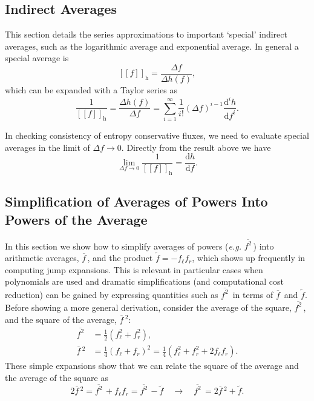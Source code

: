 \documentclass[10pt]{article}
\renewcommand{\j}[1]{\Delta #1}
\renewcommand{\d}{\mathrm{d}}
\newcommand{\avg}[1]{\overline{#1}\,}
\newcommand{\invavg}[1]{\widetilde{#1}}
\newcommand{\spavg}[2]{\left[\left[#1\right]\right]_{\mathrm{#2}}}
\begin{document}
\subsection{Indirect Averages}
This section details the series approximations to important `special' indirect averages, such as the logarithmic average and exponential average.
In general a special average is
\begin{equation}
	\spavg{f}{h} = \frac{\j{f}}{\j{h(f)}},
\end{equation}
which can be expanded with a Taylor series as
\begin{equation}
	\frac{1}{\spavg{f}{h}} = \frac{\j{h(f)}}{\j{f}} = \sum_{i=1}^{\infty}\frac{1}{i!}(\j{f})^{i-1}\frac{\d^{i}h}{\d f^{i}}.
\end{equation}

In checking consistency of entropy conservative fluxes, we need to evaluate special averages in the limit of $\j{f}\to0$.
Directly from the result above we have 
\begin{equation}
	\lim_{\j{f}\to0}\frac{1}{\spavg{f}{h}} = \frac{\d h}{\d f}.
\end{equation}


\subsection{Simplification of Averages of Powers Into Powers of the Average} \label{sec: avg powers}
In this section we show how to simplify averages of powers (\emph{e.g.} $\avg{f^2}$) into arithmetic averages, $\avg{f}$, and the product $\invavg{f} = -f_\ell f_r$, which shows up frequently in computing jump expansions.
This is relevant in particular cases when polynomials are used and dramatic simplifications (and computational cost reduction) can be gained by expressing quantities such as $\avg{f^2}$ in terms of $\avg{f}$ and $\invavg{f}$.
Before showing a more general derivation, consider the average of the square, $\avg{f^2}$, and the square of the average, $\avg{f}^2$:
\begin{equation}
	\begin{aligned}
		\avg{f^2} &= \frac{1}{2}(f_\ell^2 + f_r^2), \\
		\avg{f}^2 &= \frac{1}{4}(f_\ell + f_r)^2 = \frac{1}{4}(f_\ell^2 + f_r^2 + 2f_\ell f_r).
	\end{aligned}
\end{equation}
These simple expansions show that we can relate the square of the average and the average of the square as
\begin{equation}
	2\avg{f}^2 = \avg{f^2} + f_\ell f_r = \avg{f^2} - \invavg{f} \quad \rightarrow \quad \avg{f^2} = 2\avg{f}^2 + \invavg{f}.
\end{equation}
\end{document}
